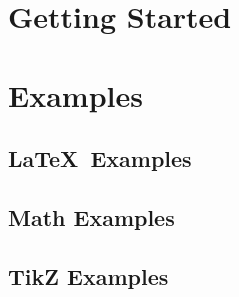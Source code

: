 
\section{Getting Started}
\label{sec:getting_started}

\section{Examples}
\label{sec:examples}

\subsection{\LaTeX\ Examples}
\label{sec:latex_examples}

\subsection{Math Examples}
\label{sec:math_examples}

\subsection{TikZ Examples}
\label{sec:tikz_examples}


